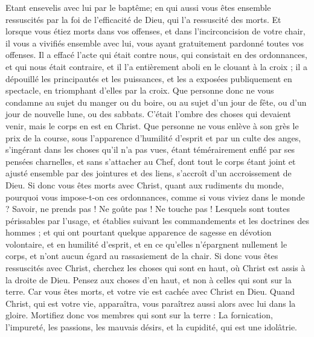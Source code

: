 \begin{multicols}{2}
Etant ensevelis avec lui par le baptême; en qui aussi vous êtes ensemble ressuscités par la foi de l'efficacité de Dieu, qui l'a ressuscité des morts.
Et lorsque vous étiez morts dans vos offenses, et dans l'incirconcision de votre chair, il vous a vivifiés ensemble avec lui, vous ayant gratuitement pardonné toutes vos offenses.
Il a effacé l'acte qui était contre nous, qui consistait en des ordonnances, et qui nous était contraire, et il l'a entièrement aboli en le clouant à la croix ;
il a dépouillé les principautés et les puissances, et les a exposées publiquement en spectacle, en triomphant d'elles par la croix.
Que personne donc ne vous condamne au sujet du manger ou du boire, ou au sujet d'un jour de fête, ou d'un jour de nouvelle lune, ou des sabbats.
C'était l'ombre des choses qui devaient venir, mais le corps en est en Christ.
Que personne ne vous enlève à son grès le prix de la course, sous l'apparence d'humilité d'esprit et par un culte des anges, s'ingérant dans les choses qu'il n'a pas vues, étant témérairement enflé par ses pensées charnelles,
et sans s'attacher au Chef, dont tout le corps étant joint et ajusté ensemble par des jointures et des liens, s'accroît d'un accroissement de Dieu.
Si donc vous êtes morts avec Christ, quant aux rudiments du monde, pourquoi vous impose-t-on ces ordonnances, comme si vous viviez dans le monde ?
Savoir, ne prends pas ! Ne goûte pas ! Ne touche pas !
Lesquels sont toutes périssables par l'usage, et établies suivant les commandements et les doctrines des hommes ; 
et qui ont pourtant quelque apparence de sagesse en dévotion volontaire, et en humilité d'esprit, et en ce qu'elles n'épargnent nullement le corps, et n'ont aucun égard au rassasiement de la chair.
\VerseOne{}Si donc vous êtes ressuscités avec Christ, cherchez les choses qui sont en haut, où Christ est assis à la droite de Dieu.
Pensez aux choses d'en haut, et non à celles qui sont sur la terre.
Car vous êtes morts, et votre vie est cachée avec Christ en Dieu.
Quand Christ, qui est votre vie, apparaîtra, vous paraîtrez aussi alors avec lui dans la gloire.
Mortifiez donc vos membres qui sont sur la terre : La fornication, l'impureté, les passions, les mauvais désirs, et la cupidité, qui est une idolâtrie.

\end{multicols}
